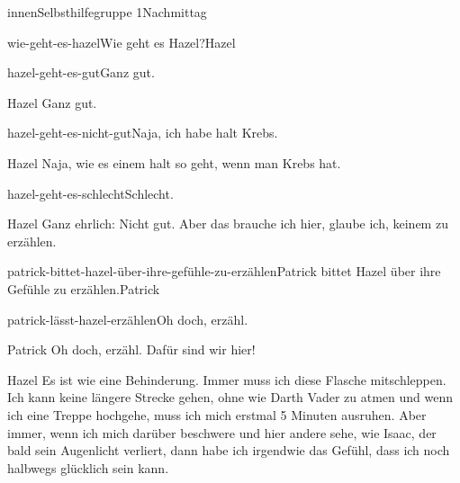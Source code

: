 \documentclass[12pt]{article}
\begin{document}
\begin{scene}[cut to]{innen}{Selbsthilfegruppe 1}{Nachmittag}
        \begin{decision}{wie-geht-es-hazel}{Wie geht es \gls{Hazel}?}{\gls{Hazel}}
            \begin{option}{hazel-geht-es-gut}{Ganz gut.}
                \begin{dialog}{Hazel}
                    Ganz gut.
                \end{dialog}
            \end{option}
            \begin{option}{hazel-geht-es-nicht-gut}{Naja, ich habe halt Krebs.}
                \begin{dialog}{Hazel}
                    Naja, wie es einem halt so geht, wenn man Krebs hat.
                \end{dialog}
            \end{option}
            \begin{option}{hazel-geht-es-schlecht}{Schlecht.}
                \begin{dialog}{Hazel}
                    Ganz ehrlich: Nicht gut.
                    Aber das brauche ich hier, glaube ich, keinem zu erzählen.
                \end{dialog}

                \begin{decision}{patrick-bittet-hazel-über-ihre-gefühle-zu-erzählen}{\gls{Patrick} bittet \gls{Hazel} über ihre Gefühle zu erzählen.}{\gls{Patrick}}
                    \begin{option}{patrick-lässt-hazel-erzählen}{Oh doch, erzähl.}
                        \begin{dialog}{Patrick}
                            Oh doch, erzähl.
                            Dafür sind wir hier!
                        \end{dialog}

                        \begin{dialog}{Hazel}
                            Es ist wie eine Behinderung.
                            Immer muss ich diese Flasche mitschleppen.
                            Ich kann keine längere Strecke gehen, ohne wie Darth Vader zu atmen und wenn ich eine Treppe hochgehe, muss ich mich erstmal 5 Minuten ausruhen.
                            Aber immer, wenn ich mich darüber beschwere und hier andere sehe, wie \gls{Isaac}, der bald sein Augenlicht verliert, dann habe ich irgendwie das Gefühl, dass ich noch halbwegs glücklich sein kann.
                        \end{dialog}


\end{option}
\end{decision}
\end{option}
\end{decision}
\end{scene}
\end{document}
